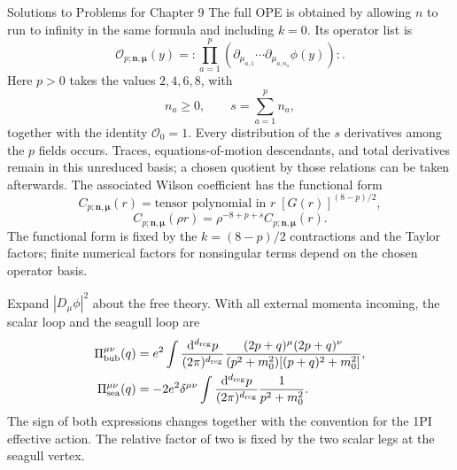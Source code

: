 \begin{bankssolutions}{Solutions to Problems for Chapter 9}
The full OPE is obtained by allowing $n$ to run to infinity in the same
formula and including $k=0$.  Its operator list is
\[
 \mathcal O_{p;\boldsymbol n,\boldsymbol\mu}(y)
 =:\!\prod_{a=1}^{p}
 \left(\partial_{\mu_{a,1}}\cdots
       \partial_{\mu_{a,n_a}}\phi(y)\right)\!: .
\]
Here $p>0$ takes the values $2,4,6,8$, with
\[
 n_a\geq0,\qquad s=\sum_{a=1}^{p}n_a,
 \]
 together with the identity $\mathcal O_{0}=1$.  Every distribution of the
 $s$ derivatives among the $p$ fields occurs.  Traces, equations-of-motion
 descendants, and total derivatives remain in this unreduced basis; a chosen
 quotient by those relations can be taken afterwards.  The associated Wilson
 coefficient has the functional form
\[
 C_{p;\boldsymbol n,\boldsymbol\mu}(r)=
 \text{tensor polynomial in }r\;[G(r)]^{(8-p)/2},
\]
\[
 C_{p;\boldsymbol n,\boldsymbol\mu}(\rho r)
 =\rho^{-8+p+s}C_{p;\boldsymbol n,\boldsymbol\mu}(r).
\]
The functional form is fixed by the $k=(8-p)/2$ contractions and the Taylor
factors; finite numerical factors for nonsingular terms depend on the chosen
operator basis.

Expand $|D_\mu\phi|^2$ about the free theory.  With all external momenta
incoming, the scalar loop and the seagull loop are
\begin{align*}
 \Pi^{\mu\nu}_{\rm bub}(q)&=e^2\int\frac{\mathop{}\!\mathrm{d}^{d_{\mathrm{reg}}}p}{(2\pi)^{d_{\mathrm{reg}}}}
 \frac{(2p+q)^\mu(2p+q)^\nu}
 {(p^2+m_0^2)[(p+q)^2+m_0^2]},\\
 \Pi^{\mu\nu}_{\rm sea}(q)&=-2e^2\delta^{\mu\nu}
 \int\frac{\mathop{}\!\mathrm{d}^{d_{\mathrm{reg}}}p}{(2\pi)^{d_{\mathrm{reg}}}}\frac1{p^2+m_0^2}.
\end{align*}
The sign of both expressions changes together with the convention for the
1PI effective action.  The relative factor of two is fixed by the two scalar
legs at the seagull vertex.


\end{bankssolutions}
